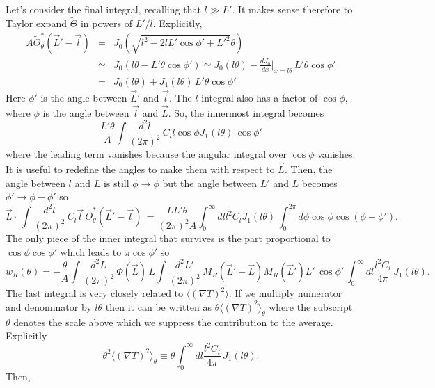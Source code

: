 \documentclass[prd,amsmath,amssymb,floatfix,superscriptaddress,nofootinbib]{revtex4-1}
\def\be{\begin{equation}}
\def\ee{\end{equation}}
\def\bea{\begin{eqnarray}}
\def\eea{\end{eqnarray}}
\newcommand{\vs}{\nonumber\\}
\newcommand{\eql}[1]{\label{eq:#1}}
\begin{document}
Let's consider the final integral, recalling that $l\gg L'$. It makes sense therefore to Taylor expand $\tilde\Theta$ in powers of $L'/l$. Explicitly,
\bea
A\tilde \Theta_\theta^*(\vec L'-\vec l) &=& J_0(\sqrt{l^2-2lL'\cos\phi'+L'^2}\theta)
\vs
&\simeq& J_0\left(l\theta - L'\theta\cos\phi'\right)
\simeq
J_0(l\theta) - \frac{dJ_0}{dx}\bigg\vert_{x=l\theta}\, L'\theta\cos\phi'
\vs
&=&J_0(l\theta) + J_1(l\theta)\, L'\theta\cos\phi'
\eea
Here $\phi'$ is the angle between $\vec L'$ and $\vec l$. The $l$ integral also has a factor of $\cos\phi$, where $\phi$ is the angle between $\vec l$ and $\vec L$. So, the innermost integral becomes
\be
\frac{L'\theta}A\int \frac{d^2l}{(2\pi)^2}\,C_{l} l\cos\phi J_1(l\theta)\, \cos\phi'\ee
where the leading term vanishes because the angular integral over $\cos\phi$ vanishes. It is useful to redefine the angles to make them with respect to $\vec L$. Then, the angle between $l$ and $L$ is still $\phi\rightarrow \phi$ but the angle between $L'$ and $L$ becomes $\phi'\rightarrow \phi-\phi'$ so 
\be
\vec L\cdot\,\int \frac{d^2l}{(2\pi)^2}\,C_{l}\vec l\,\tilde \Theta_\theta^*(\vec L'-\vec l)\, 
= \frac{LL'\theta}{(2\pi)^2A} \int_0^\infty dl l^2C_l J_1(l\theta) \,\int_0^{2\pi} d\phi\cos\phi \cos(\phi-\phi').
\ee
The only piece of the inner integral that survives is the part proportional to $\cos\phi\cos\phi'$ which leads to $\pi\cos\phi'$ so
\be
w_R(\theta) =  - \frac{\theta}{A} \int \frac{d^2L}{(2\pi)^2}\, \Phi(\vec L)\, L 
\int \frac{d^2L'}{(2\pi)^2}\, M_R(\vec L'-\vec L)  M_R(\vec L')L'\,\cos\phi'
\,\int_0^\infty dl \frac{l^2C_l}{4\pi}\,J_1(l\theta)  .
\ee
The last integral is very closely related to $\langle (\nabla T)^2\rangle$. If we multiply numerator and denominator by $l\theta$ then it can be written as $\theta\langle (\nabla T)^2\rangle_\theta$ where the subscript $\theta$ denotes the scale above which we suppress the contribution to the average. Explicitly
\be
\theta^2\langle (\nabla T)^2\rangle_\theta \equiv \theta\int_0^\infty dl \frac{l^2C_l}{4\pi}\,J_1(l\theta).\eql{dlnt}\ee
Then,
\end{document}
